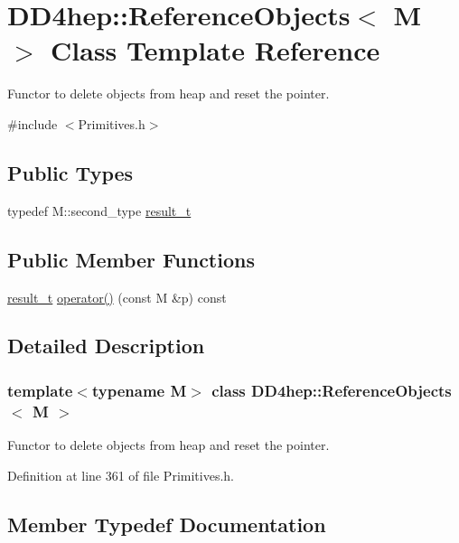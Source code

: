 \hypertarget{class_d_d4hep_1_1_reference_objects}{}\section{D\+D4hep\+:\+:Reference\+Objects$<$ M $>$ Class Template Reference}
\label{class_d_d4hep_1_1_reference_objects}


Functor to delete objects from heap and reset the pointer.  




{\ttfamily \#include $<$Primitives.\+h$>$}

\subsection*{Public Types}
\begin{DoxyCompactItemize}
\item 
typedef M\+::second\+\_\+type \hyperlink{class_d_d4hep_1_1_reference_objects_a32009de947d7ac402ba08bf9a626c5aa}{result\+\_\+t}
\end{DoxyCompactItemize}
\subsection*{Public Member Functions}
\begin{DoxyCompactItemize}
\item 
\hyperlink{class_d_d4hep_1_1_reference_objects_a32009de947d7ac402ba08bf9a626c5aa}{result\+\_\+t} \hyperlink{class_d_d4hep_1_1_reference_objects_a83c729cd863b298a0857bc859df124a0}{operator()} (const M \&p) const
\end{DoxyCompactItemize}


\subsection{Detailed Description}
\subsubsection*{template$<$typename M$>$\newline
class D\+D4hep\+::\+Reference\+Objects$<$ M $>$}

Functor to delete objects from heap and reset the pointer. 

Definition at line 361 of file Primitives.\+h.



\subsection{Member Typedef Documentation}
\hypertarget{class_d_d4hep_1_1_reference_objects_a32009de947d7ac402ba08bf9a626c5aa}{}\label{class_d_d4hep_1_1_reference_objects_a32009de947d7ac402ba08bf9a626c5aa} 
